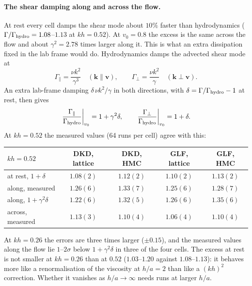 \documentclass[11pt,aps,preprint,nofootinbib,superscriptaddress,tightenlines]{revtex4-2}
\def\st{\begin{equation}}
\def\stp{\end{equation}}
\let\oldparagraph\paragraph
\renewcommand{\paragraph}{\par\bigskip\oldparagraph}
\begin{document}
\paragraph{The shear damping along and across the flow.}  At rest every cell damps the shear mode about $10\%$ faster than
hydrodynamics ($\Gamma/\Gamma_{\rm hydro}=1.08$--$1.13$ at $kh=0.52$).  At $v_0=0.8$ the excess is the same across the flow and about
$\gamma^2=2.78$ times larger along it.  This is what an extra dissipation fixed in the lab frame would do.  Hydrodynamics damps the advected shear mode at
\st
\Gamma_\parallel=\frac{\nu k^2}{\gamma^3}\quad(\bm k\parallel\bm v),\qquad \Gamma_\perp=\frac{\nu k^2}{\gamma}\quad(\bm k\perp\bm v).
\stp
An extra lab-frame damping $\delta\,\nu k^2/\gamma$ in both directions, with $\delta=\Gamma/\Gamma_{\rm hydro}-1$ at rest, then gives
\st
\left.\frac{\Gamma_\parallel}{\Gamma_{\rm hydro}}\right|_{v_0}=1+\gamma^2\delta,\qquad \left.\frac{\Gamma_\perp}{\Gamma_{\rm hydro}}\right|_{v_0}=1+\delta.
\stp
At $kh=0.52$ the measured values (64 runs per cell) agree with this:
\begin{center}
\begin{tabular}{lcccc}
\hline
$kh=0.52$ & DKD, lattice & DKD, HMC & GLF, lattice & GLF, HMC \\ \hline
at rest, $1+\delta$ & $1.08(2)$ & $1.12(2)$ & $1.10(2)$ & $1.13(2)$ \\
along, measured & $1.26(6)$ & $1.33(7)$ & $1.25(6)$ & $1.28(7)$ \\
along, $1+\gamma^2\delta$ & $1.22(6)$ & $1.32(5)$ & $1.26(6)$ & $1.35(6)$ \\
across, measured & $1.13(3)$ & $1.10(4)$ & $1.06(4)$ & $1.10(4)$ \\
\hline
\end{tabular}
\end{center}
At $kh=0.26$ the errors are three times larger ($\pm0.15$), and the measured values along the flow lie $1$--$2\sigma$ below $1+\gamma^2\delta$
in three of the four cells.  The excess at rest is not smaller at $kh=0.26$ than at $0.52$ ($1.03$--$1.20$ against $1.08$--$1.13$): it behaves more
like a renormalisation of the viscosity at $h/a=2$ than like a $(kh)^2$ correction.  Whether it vanishes as $h/a\to\infty$ needs runs at
larger $h/a$.
\end{document}
